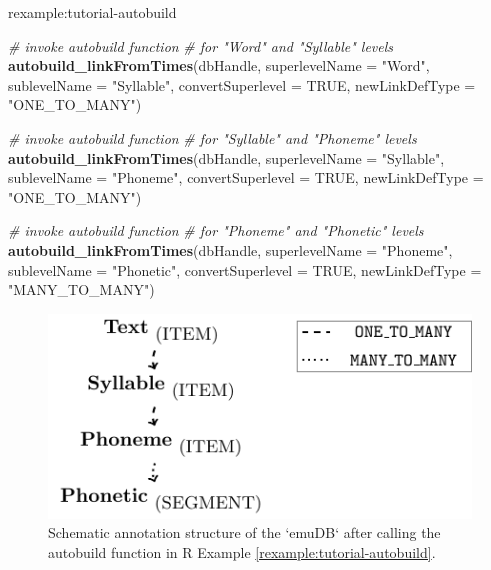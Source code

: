 \documentclass[]{book}
\newenvironment{Shaded}{\begin{snugshade}}{\end{snugshade}}
\newcommand{\CommentTok}[1]{\textcolor[rgb]{0.56,0.35,0.01}{\textit{#1}}}
\newcommand{\DataTypeTok}[1]{\textcolor[rgb]{0.13,0.29,0.53}{#1}}
\newcommand{\KeywordTok}[1]{\textcolor[rgb]{0.13,0.29,0.53}{\textbf{#1}}}
\newcommand{\NormalTok}[1]{#1}
\newcommand{\OtherTok}[1]{\textcolor[rgb]{0.56,0.35,0.01}{#1}}
\newcommand{\StringTok}[1]{\textcolor[rgb]{0.31,0.60,0.02}{#1}}
\theoremstyle{definition}
\theoremstyle{definition}
\theoremstyle{definition}
\theoremstyle{remark}
\begin{document}
rexample:tutorial-autobuild

\begin{Shaded}
\begin{Highlighting}[]
\CommentTok{# invoke autobuild function}
\CommentTok{# for "Word" and "Syllable" levels}
\KeywordTok{autobuild_linkFromTimes}\NormalTok{(dbHandle,}
                        \DataTypeTok{superlevelName =} \StringTok{"Word"}\NormalTok{,}
                        \DataTypeTok{sublevelName =} \StringTok{"Syllable"}\NormalTok{,}
                        \DataTypeTok{convertSuperlevel =} \OtherTok{TRUE}\NormalTok{,}
                        \DataTypeTok{newLinkDefType =} \StringTok{"ONE_TO_MANY"}\NormalTok{)}

\CommentTok{# invoke autobuild function}
\CommentTok{# for "Syllable" and "Phoneme" levels}
\KeywordTok{autobuild_linkFromTimes}\NormalTok{(dbHandle,}
                        \DataTypeTok{superlevelName =} \StringTok{"Syllable"}\NormalTok{,}
                        \DataTypeTok{sublevelName =} \StringTok{"Phoneme"}\NormalTok{,}
                        \DataTypeTok{convertSuperlevel =} \OtherTok{TRUE}\NormalTok{,}
                        \DataTypeTok{newLinkDefType =} \StringTok{"ONE_TO_MANY"}\NormalTok{)}

\CommentTok{# invoke autobuild function}
\CommentTok{# for "Phoneme" and "Phonetic" levels}
\KeywordTok{autobuild_linkFromTimes}\NormalTok{(dbHandle,}
                        \DataTypeTok{superlevelName =} \StringTok{"Phoneme"}\NormalTok{,}
                        \DataTypeTok{sublevelName =} \StringTok{"Phonetic"}\NormalTok{,}
                        \DataTypeTok{convertSuperlevel =} \OtherTok{TRUE}\NormalTok{,}
                        \DataTypeTok{newLinkDefType =} \StringTok{"MANY_TO_MANY"}\NormalTok{)}
\end{Highlighting}
\end{Shaded}

\begin{figure}

{\centering \includegraphics[width=0.5\linewidth]{pics/tut_simpleAnnotStruct} 

}

\caption{Schematic annotation structure of the `emuDB` after calling the autobuild function in R Example \ref{rexample:tutorial-autobuild}.}\label{fig:tutorial-simpleAnnotStruct}
\end{figure}
\end{document}
